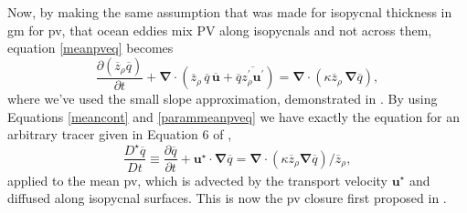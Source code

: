 \documentclass[10pt,a4paper]{article}
\newcommand*\mean[1]{\overline{#1}}
\newcommand*\res[1]{{#1}^{\prime}}
\begin{document}
                Now, by making the same assumption that was made for isopycnal thickness in 
                \gls{gm} for \gls{pv}, that ocean eddies mix PV along isopycnals and not
                across them, equation \ref{meanpveq} becomes
                \begin{equation}
                \frac{\partial \left(\mean{z}_{\rho} \mean{q}\right)}{\partial t} +
                \boldsymbol{\nabla}\cdot\left(\mean{z}_{\rho}\,\mean{q}\,\mean{\boldsymbol{u}}+\mean{q}\mean{\res{z}_{\rho} \res{\boldsymbol{u}}}\right)
                = \boldsymbol{\nabla}\cdot\left(\kappa \mean{z}_{\rho}\,\boldsymbol{\nabla}\mean{q}\right) ,
                \label{parammeanpveq}
                \end{equation}
                where we've used the small slope approximation, demonstrated in \cite{gent1990}. By using Equations \ref{meancont} and \ref{parammeanpveq} we have exactly the equation for an arbitrary tracer given in Equation 6 of \cite{gent1995parameterizing},
                \begin{equation}
                \frac{D^\star \mean{q}}{D t}\equiv\frac{\partial \mean{q}}{\partial t} + \boldsymbol{u}^\star\cdot\boldsymbol{\nabla}\mean{q} = \boldsymbol{\nabla}\cdot
                \left(\kappa \mean{z}_{\rho}\boldsymbol{\nabla} \mean{q} \right)/\mean{z}_{\rho} ,
                \end{equation}
                applied to the mean \gls{pv}, which is advected by the transport velocity $\boldsymbol{u}^\star$ and diffused along isopycnal surfaces. This is now
                the \gls{pv} closure first proposed in \cite{greatbatch1998exploring}.
                
\end{document}
